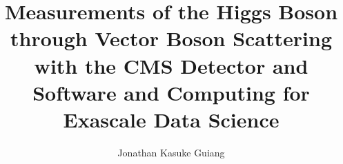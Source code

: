 \documentclass[12pt]{ucsd}
\title{Measurements of the Higgs Boson through Vector Boson Scattering with the CMS Detector and Software and Computing for Exascale Data Science}
\author{Jonathan Kasuke Guiang}
\begin{document}
\frontmatter
\maketitle
\makecopyright
\makesignature





\tableofcontents
\listoffigures
\listoftables









\mainmatter









\appendix




\backmatter

\end{document}
